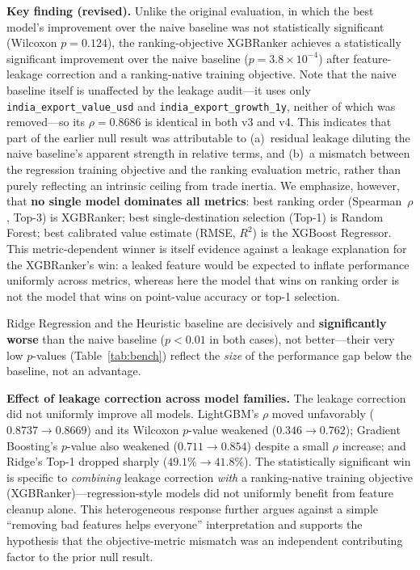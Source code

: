 \documentclass[conference]{IEEEtran}
\begin{document}
\textbf{Key finding (revised).} Unlike the original evaluation, in which the
best model's improvement over the naive baseline was not statistically
significant (Wilcoxon $p=0.124$), the ranking-objective XGBRanker achieves
a statistically significant improvement over the naive baseline
($p=3.8\times10^{-4}$) after feature-leakage correction and a
ranking-native training objective. Note that the naive baseline itself is
unaffected by the leakage audit---it uses only
\texttt{india\_export\_value\_usd} and \texttt{india\_export\_growth\_1y},
neither of which was removed---so its $\rho=0.8686$ is identical in both
v3 and v4. This indicates that part of the earlier
null result was attributable to (a)~residual leakage diluting the naive
baseline's apparent strength in relative terms, and (b)~a mismatch between
the regression training objective and the ranking evaluation metric,
rather than purely reflecting an intrinsic ceiling from trade inertia.
We emphasize, however, that \textbf{no single model dominates all metrics}:
best ranking order (Spearman~$\rho$, Top-3) is XGBRanker; best
single-destination selection (Top-1) is Random Forest; best calibrated
value estimate (RMSE, $R^2$) is the XGBoost Regressor. This
metric-dependent winner is itself evidence against a leakage explanation
for the XGBRanker's win: a leaked feature would be expected to inflate
performance uniformly across metrics, whereas here the model that wins on
ranking order is not the model that wins on point-value accuracy or top-1
selection.

Ridge Regression and the Heuristic baseline are decisively and
\textbf{significantly worse} than the naive baseline ($p < 0.01$ in both
cases), not better---their very low $p$-values (Table~\ref{tab:bench})
reflect the \emph{size} of the performance gap below the baseline, not an
advantage.

\textbf{Effect of leakage correction across model families.} The leakage
correction did not uniformly improve all models. LightGBM's $\rho$ moved
unfavorably ($0.8737 \rightarrow 0.8669$) and its Wilcoxon $p$-value
weakened ($0.346 \rightarrow 0.762$); Gradient Boosting's $p$-value also
weakened ($0.711 \rightarrow 0.854$) despite a small $\rho$ increase; and
Ridge's Top-1 dropped sharply ($49.1\% \rightarrow 41.8\%$). The
statistically significant win is specific to \emph{combining} leakage
correction \emph{with} a ranking-native training objective
(XGBRanker)---regression-style models did not uniformly benefit from
feature cleanup alone. This heterogeneous response further argues against
a simple ``removing bad features helps everyone'' interpretation and
supports the hypothesis that the objective-metric mismatch was an
independent contributing factor to the prior null result.
\end{document}
